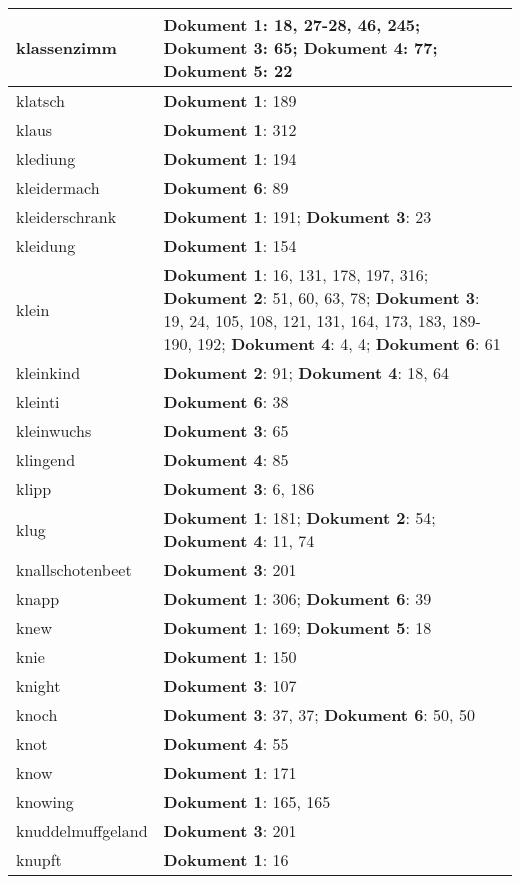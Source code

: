 \documentclass[a5paper]{article}
\begin{document}
\begin{longtable}[l]{|l|p{3in}|}
\hline
klassenzimm & \textbf{Dokument 1}: 18, 27-28, 46, 245; \textbf{Dokument 3}: 65; \textbf{Dokument 4}: 77; \textbf{Dokument 5}: 22 \\
\hline
klatsch & \textbf{Dokument 1}: 189 \\
\hline
klaus & \textbf{Dokument 1}: 312 \\
\hline
klediung & \textbf{Dokument 1}: 194 \\
\hline
kleidermach & \textbf{Dokument 6}: 89 \\
\hline
kleiderschrank & \textbf{Dokument 1}: 191; \textbf{Dokument 3}: 23 \\
\hline
kleidung & \textbf{Dokument 1}: 154 \\
\hline
klein & \textbf{Dokument 1}: 16, 131, 178, 197, 316; \textbf{Dokument 2}: 51, 60, 63, 78; \textbf{Dokument 3}: 19, 24, 105, 108, 121, 131, 164, 173, 183, 189-190, 192; \textbf{Dokument 4}: 4, 4; \textbf{Dokument 6}: 61 \\
\hline
kleinkind & \textbf{Dokument 2}: 91; \textbf{Dokument 4}: 18, 64 \\
\hline
kleinti & \textbf{Dokument 6}: 38 \\
\hline
kleinwuchs & \textbf{Dokument 3}: 65 \\
\hline
klingend & \textbf{Dokument 4}: 85 \\
\hline
klipp & \textbf{Dokument 3}: 6, 186 \\
\hline
klug & \textbf{Dokument 1}: 181; \textbf{Dokument 2}: 54; \textbf{Dokument 4}: 11, 74 \\
\hline
knallschotenbeet & \textbf{Dokument 3}: 201 \\
\hline
knapp & \textbf{Dokument 1}: 306; \textbf{Dokument 6}: 39 \\
\hline
knew & \textbf{Dokument 1}: 169; \textbf{Dokument 5}: 18 \\
\hline
knie & \textbf{Dokument 1}: 150 \\
\hline
knight & \textbf{Dokument 3}: 107 \\
\hline
knoch & \textbf{Dokument 3}: 37, 37; \textbf{Dokument 6}: 50, 50 \\
\hline
knot & \textbf{Dokument 4}: 55 \\
\hline
know & \textbf{Dokument 1}: 171 \\
\hline
knowing & \textbf{Dokument 1}: 165, 165 \\
\hline
knuddelmuffgeland & \textbf{Dokument 3}: 201 \\
\hline
knupft & \textbf{Dokument 1}: 16 \\

\end{longtable}
\end{document}
